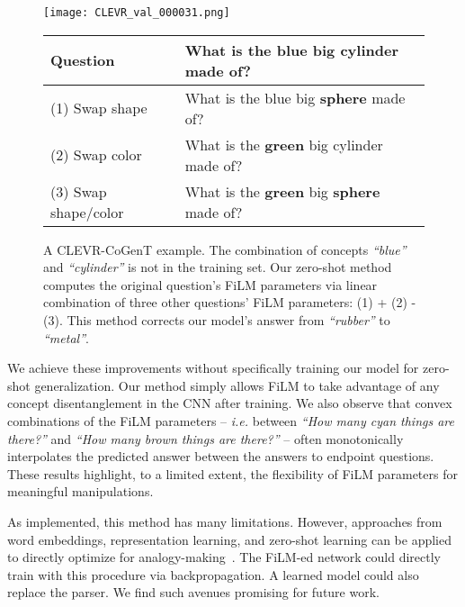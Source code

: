 \documentclass[letterpaper]{article} \usepackage{aaai18}  \usepackage{times}  \usepackage{helvet}  \usepackage{courier}  \usepackage{url}  \usepackage{graphicx}  \frenchspacing  \setlength{\pdfpagewidth}{8.5in}  \setlength{\pdfpageheight}{11in}
\begin{document}
\begin{figure}[t]
  \centering
  \texttt{[image: CLEVR\_val\_000031.png]}
        \scriptsize
  \begin{tabular}{|l| l |}
    \hline
    Question & What is the blue big cylinder made of? \\ \hline
    (1) Swap shape & What is the blue big \textbf{sphere} made of? \\
	(2) Swap color & What is the \textbf{green} big cylinder made of? \\
	(3) Swap shape/color & What is the \textbf{green} big \textbf{sphere} made of?  \\ \hline
  \end{tabular}
  \caption{A CLEVR-CoGenT example. The combination of concepts \textit{``blue''} and \textit{``cylinder''} is not in the training set. Our zero-shot method computes the original question's FiLM parameters via linear combination of three other questions' FiLM parameters: (1) + (2) - (3). This method corrects our model's answer from \textit{``rubber''} to \textit{``metal''}.}
  \label{fig:zero-shot-generalization}
\end{figure}
    
    We achieve these improvements without specifically training our model for zero-shot generalization. Our method simply allows FiLM to take advantage of any concept disentanglement in the CNN after training. We also observe that convex combinations of the FiLM parameters -- \textit{i.e.} between \textit{``How many cyan things are there?''} and \textit{``How many brown things are there?''} -- often monotonically interpolates the predicted answer between the answers to endpoint questions. These results highlight, to a limited extent, the flexibility of FiLM parameters for meaningful manipulations.

    As implemented, this method has many limitations. However, approaches from word embeddings, representation learning, and zero-shot learning can be applied to directly optimize  for analogy-making~\cite{TransE,gu2015traversing,46127}. The FiLM-ed network could directly train with this procedure via backpropagation. A learned model could also replace the parser. We find such avenues promising for future work.
\end{document}
